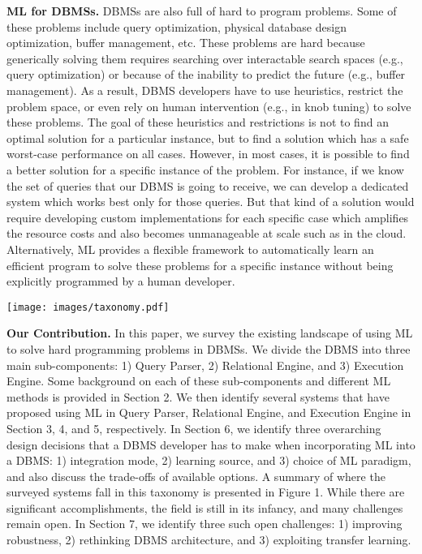 \vspace{2mm}
\noindent \textbf{ML for DBMSs.} DBMSs are also full of hard to program problems.
Some of these problems include query optimization, physical database design optimization, buffer management, etc.
These problems are hard because generically solving them requires searching over interactable search spaces (e.g., query optimization) or because of the inability to predict the future (e.g., buffer management).
As a result, DBMS developers have to use heuristics, restrict the problem space, or even rely on human intervention (e.g., in knob tuning) to solve these problems.
The goal of these heuristics and restrictions is not to find an optimal solution for a particular instance, but to find a solution which has a safe worst-case performance on all cases.
However, in most cases, it is possible to find a better solution for a specific instance of the problem.
For instance, if we know the set of queries that our DBMS is going to receive, we can develop a dedicated system which works best only for those queries.
But that kind of a solution would require developing custom implementations for each specific case which amplifies the resource costs and also becomes unmanageable at scale such as in the cloud.
Alternatively, ML provides a flexible framework to automatically learn an efficient program to solve these problems for a specific instance without being explicitly programmed by a human developer.

\begin{figure*}
    \centering
    \vspace{-6mm}
    \texttt{[image: images/taxonomy.pdf]}
\end{figure*}

\vspace{2mm}
\noindent \textbf{Our Contribution.} In this paper, we survey the existing landscape of using ML to solve hard programming problems in DBMSs. 
We divide the DBMS into three main sub-components: 1) Query Parser, 2) Relational Engine, and 3) Execution Engine. Some background on each of these sub-components and different ML methods is provided in Section 2.
We then identify several systems that have proposed using ML in Query Parser, Relational Engine, and Execution Engine in Section 3, 4, and 5, respectively.
In Section 6, we identify three overarching design decisions that a DBMS developer has to make when incorporating ML into a DBMS: 1) integration mode, 2) learning source, and 3) choice of ML paradigm, and also discuss the trade-offs of available options.
A summary of where the surveyed systems fall in this taxonomy is presented in Figure 1.
While there are significant accomplishments, the field is still in its infancy, and many challenges remain open.
In Section 7, we identify three such open challenges: 1) improving robustness, 2) rethinking DBMS architecture, and 3) exploiting transfer learning.